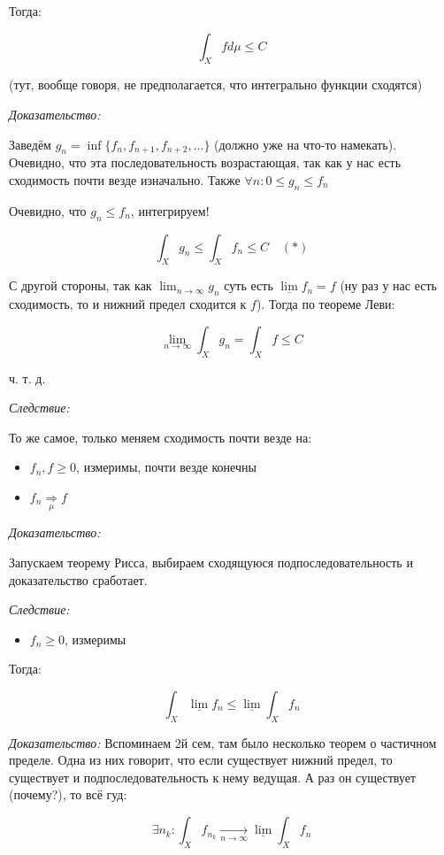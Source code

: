\documentclass{article}
\def\goesto#1{\underset{#1}{\longrightarrow}}
\def\toinf#1{\goesto{#1 \rightarrow \infty}}
\def\ntoinf{\toinf{n}}
\begin{document}
Тогда:

\[\int_{X} f d\mu \le C\]

(тут, вообще говоря, не предполагается, что интегрально функции сходятся)

\textit{Доказательство:}

Заведём $g_n = \inf \{f_n, f_{n + 1}, f_{n + 2}, \ldots\}$ (должно уже на что-то намекать). Очевидно, что эта последовательность возрастающая, так как у нас есть сходимость почти везде изначально. Также $\forall n : 0 \le g_n \le f_n$

Очевидно, что $g_n \le f_n$, интегрируем!

\[\int_{X} g_n \le \int_{X} f_n \le C \quad (*)\]

С другой стороны, так как $\lim_{n \rightarrow \infty} g_n$ суть есть $\underline{\lim} f_n = f$ (ну раз у нас есть сходимость, то и нижний предел сходится к $f$). Тогда по теореме Леви:

\[\lim_{n \rightarrow \infty} \int_{X} g_n = \int_{X} f \le C\]

ч. т. д.

\textit{Следствие: }

То же самое, только меняем сходимость почти везде на: 

\begin{itemize}
    \item $f_n, f \ge 0$, измеримы, почти везде конечны
    \item $f_n \underset{\mu}{\Longrightarrow} f$
\end{itemize}

\textit{Доказательство: }

Запускаем теорему Рисса, выбираем сходящуюся подпоследовательность и доказательство сработает.

\textit{Следствие: }

\begin{itemize}
    \item $f_n \ge 0$, измеримы
\end{itemize}

Тогда:

\[\int_{X} \underline{\lim}f_n \le \underline{\lim}\int_{X} f_n\]

\textit{Доказательство: }
Вспоминаем 2й сем, там было несколько теорем о частичном пределе. Одна из них говорит, что если существует нижний предел, то существует и подпоследовательность к нему ведущая. А раз он существует (почему?), то всё гуд:

\[\exists n_k: \int_{X} f_{n_k} \ntoinf \underline{\lim} \int_{X} f_n\]
\end{document}
